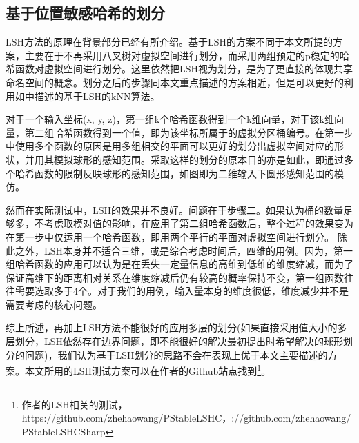 \subsection*{基于位置敏感哈希的划分}
\par
LSH方法的原理在背景部分已经有所介绍。基于LSH的方案不同于本文所提的方案，主要在于不再采用八叉树对虚拟空间进行划分，而采用两组预定的p稳定的哈希函数对虚拟空间进行划分。这里依然把LSH视为划分，是为了更直接的体现共享命名空间的概念。划分之后的步骤同本文重点描述的方案相近，但是可以更好的利用如\cite{LSHKNNRef}中描述的基于LSH的kNN算法。
\par
对于一个输入坐标(x, y, z)，第一组k个哈希函数得到一个k维向量，对于该k维向量，第二组哈希函数得到一个值，即为该坐标所属于的虚拟分区桶编号。在第一步中使用多个函数的原因是用多组相交的平面可以更好的划分出虚拟空间对应的形状，并用其模拟球形的感知范围。采取这样的划分的原本目的亦是如此，即通过多个哈希函数的限制反映球形的感知范围，如图即为二维输入下圆形感知范围的模仿。
\par
然而在实际测试中，LSH的效果并不良好。问题在于步骤二。如果认为桶的数量足够多，不考虑取模对值的影响，在应用了第二组哈希函数后，整个过程的效果变为在第一步中仅运用一个哈希函数，即用两个平行的平面对虚拟空间进行划分。
除此之外，LSH本身并不适合三维，或是综合考虑时间后，四维的用例。因为，第一组哈希函数的应用可以认为是在丢失一定量信息的高维到低维的维度缩减，而为了保证高维下的距离相对关系在维度缩减后仍有较高的概率保持不变，第一组函数往往需要选取多于4个。对于我们的用例，输入量本身的维度很低，维度减少并不是需要考虑的核心问题。
\par
综上所述，再加上LSH方法不能很好的应用多层的划分(如果直接采用值大小的多层划分，LSH依然存在边界问题，即不能很好的解决最初提出时希望解决的球形划分的问题)，我们认为基于LSH划分的思路不会在表现上优于本文主要描述的方案。本文所用的LSH测试方案可以在作者的Github站点找到\footnote{作者的LSH相关的测试，https://github.com/zhehaowang/PStableLSHC，://github.com/zhehaowang/PStableLSHCSharp}。

